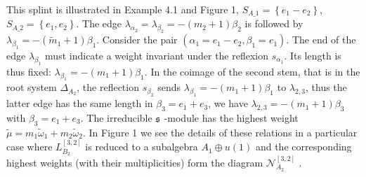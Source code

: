 \begin{itemize}
This splint is illustrated in Example 4.1 and Figure 1, 
$S_{A\_1}=\left\{ e_{1}-e_{2}\right\} $, $S_{A\_2}=\left\{
e_{1},e_{2}\right\} $. The edge $\lambda _{\alpha _{2}}=\lambda
_{\beta _{2}}=-\left( m_{2}+1\right) \beta _{2}$ is followed by
$\lambda _{\beta _{1}}=-\left( \widetilde{m}_{1}+1\right) \beta
_{1}$. Consider the pair $\left( \alpha
_{1}=e_{1}-e_{2},\beta _{1}=e_{1}\right)$. The end of the edge
$\lambda _{\beta _{1}}$ must indicate a weight
invariant under the reflexion $s_{\alpha _{1}}$.  Its length is thus fixed: 
$\lambda _{\beta _{1}}=-\left( m_{1}+1\right) \beta _{1}$. In the
coimage of
the second stem, that is in the root system $\Delta_{A_{2}}$, the reflection 
$s_{\beta _{2}}$ sends $\lambda _{\beta _{1}}=-\left(
m_{1}+1\right) \beta
_{1}$ to $\lambda _{2,3}$, thus the latter edge has the same length in $%
\beta _{3}=e_{1}+e_{3}$, we have $\lambda _{2,3}=-\left(
m_{1}+1\right)
\beta _{3}$ with $\beta _{3}=e_{1}+e_{3}$. The irreducible $\frak{s}$%
-module has the highest weight $\widetilde{\mu }=m_{1}\widetilde{\omega }%
_{1}+m_{2}\widetilde{\omega }_{2}$. In Figure 1 we see the
details of these relations in a particular case where
$L_{B_{2}}^{\left[ 3,2\right] }$ is reduced to a subalgebra
$A_{1}\oplus u\left( 1\right) $ and the
corresponding highest weights (with their multiplicities) form the diagram $%
\mathcal{N}_{A_2}^{\left[ 3,2\right] }$ .
\end{itemize}



